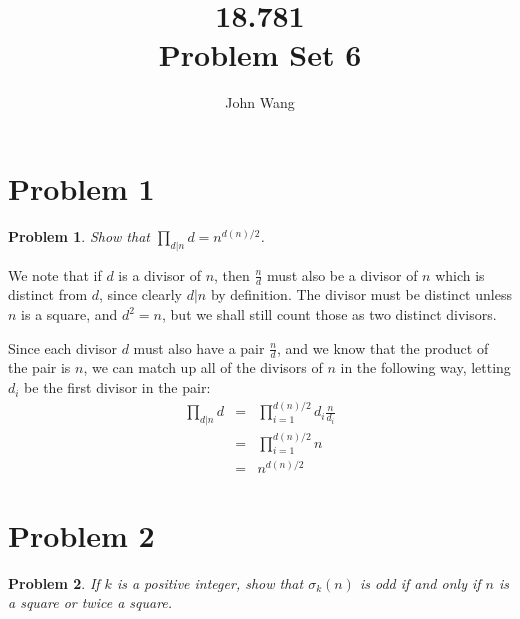 \documentclass[psamsfonts]{amsart}
\title{18.781 \\
Problem Set 6}
\author{John Wang}
\newtheorem{prob}{Problem}[section]
\newenvironment{sol}{{\bfseries Solution}}{\qedsymbol}
\theoremstyle{definition}
\theoremstyle{remark}
\numberwithin{equation}{section}
\begin{document}
\maketitle

\section{Problem 1}

\begin{prob}
Show that $\prod_{d|n} d = n^{d(n)/2}$. 
\end{prob}

\begin{sol}
We note that if $d$ is a divisor of $n$, then $\frac{n}{d}$ must also be a divisor of $n$ which is distinct from $d$, since clearly $d | n$ by definition. The divisor must be distinct unless $n$ is a square, and $d^2 = n$, but we shall still count those as two distinct divisors. 

Since each divisor $d$ must also have a pair $\frac{n}{d}$, and we know that the product of the pair is $n$, we can match up all of the divisors of $n$ in the following way, letting $d_i$ be the first divisor in the pair: 
\begin{eqnarray}
\prod_{d|n} d &=& \prod_{i = 1}^{d(n)/2} d_i \frac{n}{d_i} \\
&=& \prod_{i=1}^{d(n)/2} n \\
&=& n^{d(n)/2}
\end{eqnarray}
\end{sol}

\section{Problem 2}

\begin{prob}
If $k$ is a positive integer, show that $\sigma_k(n)$ is odd if and only if $n$ is a square or twice a square.
\end{prob}
\end{document}
